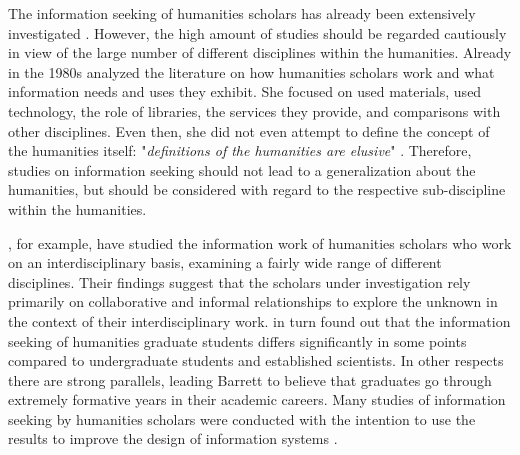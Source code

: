 \documentclass[12pt, a4paper, titlepage, oneside, abstract=true, toc=listof, toc=bibliography, BCOR=1cm]{scrreprt}
\begin{document}
The information seeking of humanities scholars has already been extensively investigated \citep[e.g.][]{Barrett2005, Benardou2013, Bulger2011, Bronstein2007a, Catalano2013, Ellis1993, Korobili2011, Palmer2002, Rimmer2006, Stone1982, Unsworth2000}. However, the high amount of studies should be regarded cautiously in view of the large number of different disciplines within the humanities. Already in the 1980s \citet{Stone1982} analyzed the literature on how humanities scholars work and what information needs and uses they exhibit. She focused on used materials, used technology, the role of libraries, the services they provide, and comparisons with other disciplines. Even then, she did not even attempt to define the concept of the humanities itself: "\textit{definitions of the humanities are elusive}" \citep[p. 293]{Stone1982}. Therefore, studies on information seeking should not lead to a generalization about the humanities, but should be considered with regard to the respective sub-discipline within the humanities.

\citet{Palmer2009}, for example, have studied the information work of humanities scholars who work on an interdisciplinary basis, examining a fairly wide range of different disciplines. Their findings suggest that the scholars under investigation rely primarily on collaborative and informal relationships to explore the unknown in the context of their interdisciplinary work. \citet{Barrett2005} in turn found out that the information seeking of humanities graduate students differs significantly in some points compared to undergraduate students and established scientists. In other respects there are strong parallels, leading Barrett to believe that graduates go through extremely formative years in their academic careers. Many studies of information seeking by humanities scholars were conducted with the intention to use the results to improve the design of information systems \citep[e.g.][]{Benardou2013, Bulger2011, Given2018, Rimmer2006}.
\end{document}
